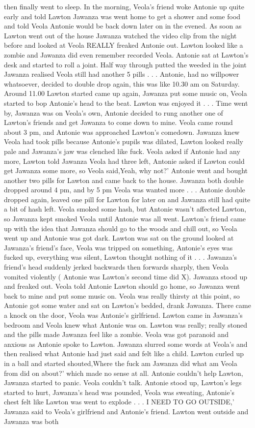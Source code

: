 \documentclass[12pt]{book}
\begin{document}
then finally went to sleep. In the morning, Veola's friend woke Antonie up quite early and told Lawton Jawanza was went home to get a shower and some food and told Veola Antonie would be back down later on in the evened. As soon as Lawton went out of the house Jawanza watched the video clip from the night before and looked at Veola REALLY freaked Antonie out. Lawton looked like a zombie and Jawanza did even remember recorded Veola. Antonie sat at Lawton's desk and started to roll a joint. Half way through putted the weeded in the joint Jawanza realised Veola still had another 5 pills . . .  Antonie, had no willpower whatsoever, decided to double drop again, this was like 10.30 am on Saturday. Around 11.00 Lawton started came up again, Jawanza put some music on, Veola started to bop Antonie's head to the beat. Lawton was enjoyed it . . .  Time went by, Jawanza was on Veola's own, Antonie decided to rung another one of Lawton's friends and get Jawanza to come down to mine. Veola came round about 3 pm, and Antonie was approached Lawton's comedown. Jawanza knew Veola had took pills because Antonie's pupils was dilated, Lawton looked really pale and Jawanza's jaw was clenched like fuck. Veola asked if Antonie had any more, Lawton told Jawanza Veola had three left, Antonie asked if Lawton could get Jawanza some more, so Veola said,Yeah, why not?' Antonie went and bought another two pills for Lawton and came back to the house. Jawanza both double dropped around 4 pm, and by 5 pm Veola was wanted more . . .  Antonie double dropped again, leaved one pill for Lawton for later on and Jawanza still had quite a bit of hash left. Veola smoked some hash, but Antonie wasn't affected Lawton, so Jawanza kept smoked Veola until Antonie was all went. Lawton's friend came up with the idea that Jawanza should go to the woods and chill out, so Veola went up and Antonie was got dark. Lawton was sat on the ground looked at Jawanza's friend's face, Veola was tripped on something, Antonie's eyes was fucked up, everything was silent, Lawton thought nothing of it . . .  Jawanza's friend's head suddenly jerked backwards then forwards sharply, then Veola vomited violently ( Antonie was Lawton's second time did X). Jawanza stood up and freaked out. Veola told Antonie Lawton should go home, so Jawanza went back to mine and put some music on. Veola was really thirsty at this point, so Antonie got some water and sat on Lawton's bedded, drank Jawanza. There came a knock on the door, Veola was Antonie's girlfriend. Lawton came in Jawanza's bedroom and Veola knew what Antonie was on. Lawton was really; really stoned and the pills made Jawanza feel like a zombie. Veola was got paranoid and anxious as Antonie spoke to Lawton. Jawanza slurred some words at Veola's and then realised what Antonie had just said and felt like a child. Lawton curled up in a ball and started shouted,Where the fuck am Jawanza did what am Veola from did on about?' which made no sense at all. Antonie couldn't help Lawton, Jawanza started to panic. Veola couldn't talk. Antonie stood up, Lawton's legs started to hurt, Jawanza's head was pounded, Veola was sweating, Antonie's chest felt like Lawton was went to explode . . . I NEED TO GO OUTSIDE,' Jawanza said to Veola's girlfriend and Antonie's friend. Lawton went outside and Jawanza was both 
\end{document}

